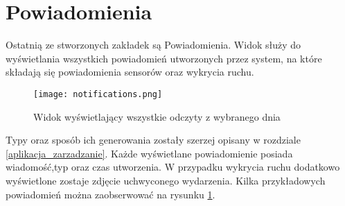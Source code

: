 \section{Powiadomienia} \label{notifications}
Ostatnią ze stworzonych zakładek są Powiadomienia. Widok służy do wyświetlania wszystkich powiadomień utworzonych przez system, na które składają się powiadomienia sensorów oraz wykrycia ruchu.
\begin{figure}[H]
	\centering
	\texttt{[image: notifications.png]}
	\caption{Widok wyświetlający wszystkie odczyty z wybranego dnia}
	\label{fig:notifications}
\end{figure}
 Typy oraz sposób ich generowania zostały szerzej opisany w rozdziale \ref{aplikacja_zarzadzanie}. Każde wyświetlane powiadomienie posiada wiadomość,typ oraz czas utworzenia. W przypadku wykrycia ruchu dodatkowo wyświetlone zostaje zdjęcie uchwyconego wydarzenia. Kilka przykładowych powiadomień można zaobserwować na rysunku \ref{fig:notifications}.
 
